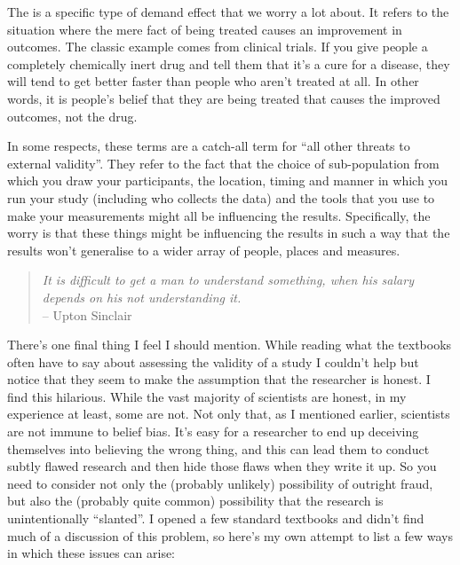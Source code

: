 The  is a specific type of demand effect that we worry a lot about. It refers to the situation where the mere fact of being treated causes an improvement in outcomes. The classic example comes from clinical trials. If you give people a completely chemically inert drug and tell them that it's a cure for a disease, they will tend to get better faster than people who aren't treated at all. In other words, it is people's belief that they are being treated that causes the improved outcomes, not the drug.

 
In some respects, these terms are a catch-all term for ``all other threats to external validity''. They refer to the fact that the choice of sub-population from which you draw your participants, the location, timing and manner in which you run your study (including who collects the data) and the tools that you use to make your measurements might all be influencing the results. Specifically, the worry is that these things might be influencing the results in such a way that the results won't generalise to a wider array of people, places and measures. 
 

\begin{quote}
{\it It is difficult to get a man to understand something, when his salary depends on his not understanding it.}\\
\hspace*{2cm}-- Upton Sinclair
\end{quote}

There's one final thing I feel I should mention. While reading what the textbooks often have to say about assessing the validity of a study I couldn't help but notice that they seem to  make the assumption that the researcher is honest. I find this hilarious. While the vast majority of scientists are honest, in my experience at least, some are not. Not only that, as I mentioned earlier, scientists are not immune to belief bias. It's easy for a researcher to end up deceiving themselves into believing the wrong thing, and this can lead them to conduct subtly flawed research and then hide those flaws when they write it up. So you need to consider not only the (probably unlikely) possibility of outright fraud, but also the (probably quite common) possibility that the research is unintentionally ``slanted''. I opened a few standard textbooks and didn't find much of a discussion of this problem, so here's my own attempt to list a few ways in which these issues can arise:

